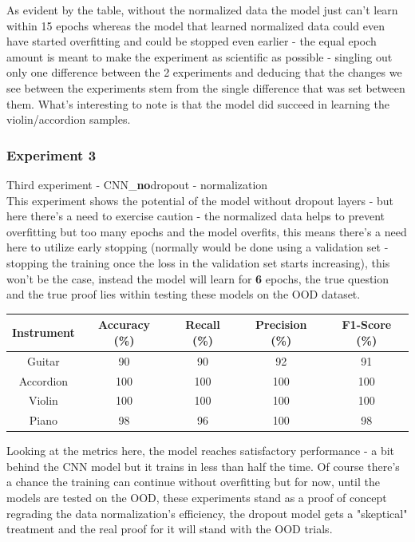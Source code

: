 \documentclass[a4paper]{article}
\begin{document}
As evident by the table, without the normalized data the model just can't learn within 15 epochs whereas the model that learned normalized data could even have started overfitting and could be stopped even earlier - the equal epoch amount is meant to make the experiment as scientific as possible - singling out only one difference between the 2 experiments and deducing that the changes we see between the experiments stem from the single difference that was set between them.
What's interesting to note is that the model did succeed in learning the violin/accordion samples.

\subsubsection{Experiment 3}
Third experiment - CNN\_\textbf{no}dropout - normalization\\
\noindent This experiment shows the potential of the model without dropout layers - but here there's a need to exercise caution - the normalized data helps to prevent overfitting but too many epochs and the model overfits, this means there's a need here to utilize early stopping (normally would be done using a validation set - stopping the training once the loss in the validation set starts increasing), this won't be the case, instead the model will learn for \textbf{6} epochs, the true question and the true proof lies within testing these models on the OOD dataset.

\begin{table}[h]
\centering
\begin{adjustbox}{width=\linewidth}    
\begin{tabular}{c c c c c} %
\hline   
Instrument & Accuracy (\%) & Recall (\%) & Precision (\%) & F1-Score (\%) \\
\hline\hline
Guitar & 90 & 90 & 92 & 91\\
Accordion & 100  & 100 & 100 & 100\\
Violin & 100  & 100 & 100 & 100\\
Piano & 98  & 96 & 100 & 98\\
\hline
\end{tabular}
\end{adjustbox}
\end{table}

Looking at the metrics here, the model reaches satisfactory performance - a bit behind the CNN model but it trains in less than half the time. Of course there's a chance the training can continue without overfitting but for now, until the models are tested on the OOD, these experiments stand as a proof of concept regrading the data normalization's efficiency, the dropout model gets a "skeptical" treatment and the real proof for it will stand with the OOD trials.
\end{document}
